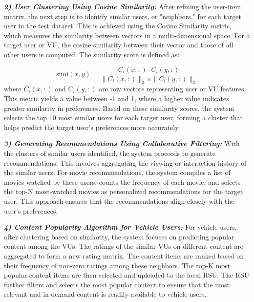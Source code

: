\documentclass[journal]{IEEEtran}
\begin{document}
\textbf{\textit{2) User Clustering Using Cosine Similarity:}} After refining the user-item matrix, the next step is to identify similar users, or "neighbors," for each target user in the test dataset. This is achieved using the Cosine Similarity metric, which measures the similarity between vectors in a multi-dimensional space. For a target user or VU, the cosine similarity between their vector and those of all other users is computed. The similarity score is defined as:

\begin{equation}
\text{simi}(x, y) = \frac{C_i(x,:) \cdot C_i(y,:)}{\|C_i(x,:)\|_2 \times \|C_i(y,:)\|_2}
\end{equation}
where \( C_i(x,:) \) and \( C_i(y,:) \) are row vectors representing user or VU features. This metric yields a value between -1 and 1, where a higher value indicates greater similarity in preferences. Based on these similarity scores, the system selects the top 10 most similar users for each target user, forming a cluster that helps predict the target user's preferences more accurately.

\textbf{\textit{3) Generating Recommendations Using Collaborative Filtering:}} With the clusters of similar users identified, the system proceeds to generate recommendations. This involves aggregating the viewing or interaction history of the similar users. For movie recommendations, the system compiles a list of movies watched by these users, counts the frequency of each movie, and selects the top-N most-watched movies as personalized recommendations for the target user. This approach ensures that the recommendations align closely with the user’s preferences.

\textbf{\textit{4) Content Popularity Algorithm for Vehicle Users:}} For vehicle users, after clustering based on similarity, the system focuses on predicting popular content among the VUs. The ratings of the similar VUs on different content are aggregated to form a new rating matrix. The content items are ranked based on their frequency of non-zero ratings among these neighbors. The top-K most popular content items are then selected and uploaded to the local RSU. The RSU further filters and selects the most popular content to ensure that the most relevant and in-demand content is readily available to vehicle users.
\end{document}
